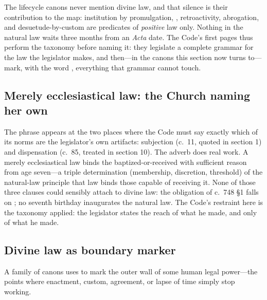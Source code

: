 The lifecycle canons never mention divine law, and that silence is their contribution to the map: institution by promulgation, , retroactivity, abrogation, and desuetude-by-custom are predicates of \emph{positive} law only. Nothing in the natural law waits three months from an \emph{Acta} date. The Code's first pages thus perform the taxonomy before naming it: they legislate a complete grammar for the law the legislator makes, and then---in the canons this section now turns to---mark, with the word , everything that grammar cannot touch.

\subsection{Merely ecclesiastical law: the Church naming her own}

The phrase  appears at the two places where the Code must say exactly which of its norms are the legislator's own artifacts: subjection (c.~11, quoted in section 1) and dispensation (c.~85, treated in section 10). The adverb does real work. A merely ecclesiastical law binds the baptized-or-received with sufficient reason from age seven---a triple determination (membership, discretion, threshold) of the natural-law principle that law binds those capable of receiving it. None of those three clauses could sensibly attach to divine law: the obligation of c.~748 §1 falls on ; no seventh birthday inaugurates the natural law. The Code's restraint here is the taxonomy applied: the legislator states the reach of what he made, and only of what he made.

\subsection{Divine law as boundary marker}

A family of canons uses  to mark the outer wall of some human legal power---the points where enactment, custom, agreement, or lapse of time simply stop working.

